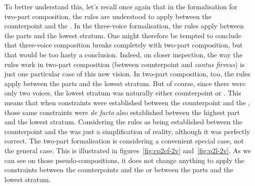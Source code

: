 To better understand this, let's recall once again that in the formalisation for two-part composition, the rules are understood to apply between the counterpoint and the \cf. In the three-voice formalisation, the rules apply between the parts and the lowest stratum. One might therefore be tempted to conclude that three-voice composition breaks completely with two-part composition, but that would be too hasty a conclusion. Indeed, on closer inspection, the way the rules work in two-part composition (between counterpoint and \textit{cantus firmus}) is just one particular case of this new vision. In two-part composition, too, the rules apply between the parts and the lowest stratum. But of course, since there were only two voices, the lowest stratum was naturally either counterpoint or \cf. This means that when constraints were established between the counterpoint and the \cf, those same constraints were \textit{de facto} also established between the highest part and the lowest stratum. Considering the rules as being established between the counterpoint and the \cfs was just a simplification of reality, although it was perfectly correct. The two-part formalisation is considering a convenient special case, not the general case. This is illustrated in figures~\ref{fig:cp2cf-2v} and~\ref{fig:p2l-2v}. As we can see on those pseudo-compositions, it does not change anything to apply the constraints between the counterpoints and the \cfs or between the parts and the lowest stratum.

